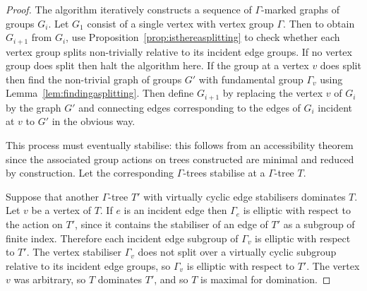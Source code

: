 \begin{proof} The algorithm iteratively constructs a sequence of
$\Gamma$-marked graphs of groups $G_i$. Let $G_1$ consist of a single vertex
with vertex group $\Gamma$. Then to obtain $G_{i+1}$ from $G_i$, use
Proposition~\ref{prop:isthereasplitting} to check whether each vertex group
splits non-trivially relative to its incident edge groups. If no vertex group
does split then halt the algorithm here. If the group at a vertex $v$ does
split then find the non-trivial graph of groups $G'$ with fundamental group
$\Gamma_v$ using Lemma~\ref{lem:findingasplitting}. Then define $G_{i+1}$ by
replacing the vertex $v$ of $G_i$ by the graph $G'$ and connecting edges
corresponding to the edges of $G_i$ incident at $v$ to $G'$ in the obvious
way.

This process must eventually stabilise: this follows from an accessibility
theorem~\cite{bestvinafeighn91} since the associated group actions on trees
constructed are minimal and reduced by construction. Let the corresponding
$\Gamma$-trees stabilise at a $\Gamma$-tree $T$. 

Suppose that another $\Gamma$-tree $T'$ with virtually cyclic edge stabilisers
dominates $T$. Let $v$ be a vertex of $T$. If $e$ is an incident edge then
$\Gamma_e$ is elliptic with respect to the action on $T'$, since it contains
the stabiliser of an edge of $T'$ as a subgroup of finite index.  Therefore
each incident edge subgroup of $\Gamma_v$ is elliptic with respect to $T'$. The
vertex stabiliser $\Gamma_v$ does not split over a virtually cyclic subgroup
relative to its incident edge groups, so $\Gamma_v$ is elliptic with respect to
$T'$. The vertex $v$ was arbitrary, so $T$ dominates $T'$, and so $T$ is maximal
for domination.  \end{proof}

